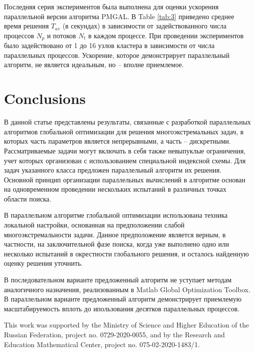 \documentclass[
11pt,%
tightenlines,%
twoside,%
onecolumn,%
nofloats,%
nobibnotes,%
nofootinbib,%
superscriptaddress,%
noshowpacs,%
centertags]%
{revtex4}
\begin{document}
Последняя серия экспериментов была выполнена для оценки ускорения параллельной версии алгоритма PMGAL. 
В Table \ref{tab:3} приведено среднее время решения $T_{av}$ (в секундах) в зависимости от задействованного числа процессов $N_{p}$ и потоков $N_{t}$ в каждом процессе. При проведении экспериментов было задействовано от 1 до 16 узлов кластера в зависимости от числа параллельных процессов. 
Ускорение, которое демонстрирует параллельный алгоритм, не является идеальным, но -- вполне приемлемое.   


\section{Conclusions}

В данной статье представлены результаты, связанные с разработкой параллельных алгоритмов глобальной оптимизации для решения многоэкстремальных задач, в которых часть параметров является непрерывными, а часть -- дискретными.
Рассматриваемые задачи могут включать в себя также невыпуклые ограничения, учет которых организован с использованием специальной индексной схемы. 
Для задач указанного класса предложен параллельный алгоритм их решения. Основной принцип организации параллельных вычислений в алгоритме основан на одновременном проведении нескольких испытаний в различных точках области поиска. 

В параллельном алгоритме глобальной оптимизации использована техника локальной настройки, основанная на предположении слабой многоэкстремальности задачи. Данное предположение является верным, в частности, на заключительной фазе поиска, когда уже выполнено одно или несколько испытаний в окрестности глобального решения, и осталось найденную оценку решения уточнить.

В последовательном варианте предложенный алгоритм не уступает методам аналогичного назначения, реализованным в Matlab Global Optimization Toolbox.
В параллельном варианте предложенный алгоритм демонстрирует приемлемую масштабируемость вплоть до ипользования десятков параллельных процессов. 


\begin{acknowledgments}
This work was supported by the Ministry of Science and Higher Education of the Russian Federation, project no. 0729-2020-0055, and by the Research and Education Mathematical Center, project no. 075-02-2020-1483/1.
\end{acknowledgments}


%
%
\end{document}
